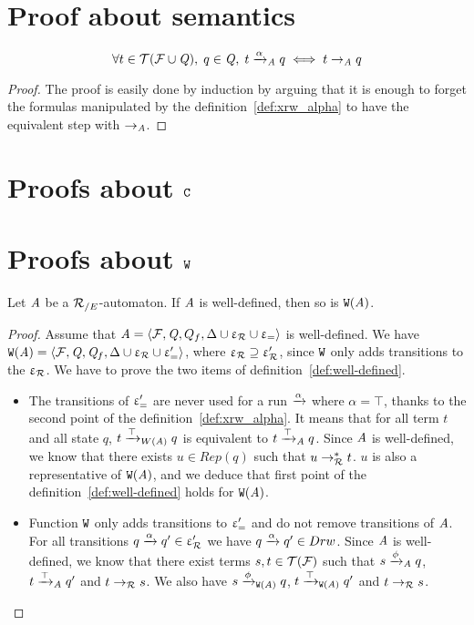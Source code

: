 \section{Proof about semantics}
\setcounter{savetheorem}{\thetheorem}
\setcounter{theorem}{4}

\begin{theorem}
  \[\forall t\in\mathcal{ T(F \cup \mathit Q)},\; q \in \mathit Q,\; t \xrightarrow{\alpha}_\mathit A q \; \Longleftrightarrow \; t \rightarrow_\mathit A q \]
\end{theorem}

\begin{proof}
  The proof is easily done by induction by arguing that it is enough to forget the formulas
  manipulated by the definition~\ref{def:xrw_alpha} to have the equivalent step with $\rightarrow_\mathit A$.
\end{proof}
\setcounter{theorem}{\thesavetheorem}

\section{Proofs about $\mathtt{C}$}


\section{Proofs about $\mathtt{W}$}

\begin{lemma}
  Let $\mathit A$ be a ${\mathcal R_{/E}}$-automaton. If $\mathit A$ is well-defined, then so is $\mathtt{W}(\mathit A)$.
\end{lemma}

\begin{proof}
  Assume that $\mathit A = \langle \mathcal{F}, \mathit Q, Q_f, \Delta \cup \upvarepsilon_{\mathcal R} \cup \upvarepsilon_{=}\rangle$ is well-defined.
  We have $\mathtt{W}(\mathit A) = \langle \mathcal{F}, \mathit Q, \mathit Q_f, \Delta \cup \upvarepsilon_{\mathcal R} \cup \upvarepsilon_{=}'\rangle$, where $\upvarepsilon_{\mathcal R} \supseteq \upvarepsilon_{\mathcal R}'$,
  since $\mathtt{W}$ only adds transitions to the $\upvarepsilon_{\mathcal R}$. We have to prove the two items of definition~\ref{def:well-defined}.
  \begin{itemize}
  \item 
    The transitions of $\upvarepsilon_{=}'$ are never used for a run $\xrightarrow{\alpha}$ where $\alpha = \top$,
    thanks to the second point of the definition~\ref{def:xrw_alpha}.
    It means that for all term $t$ and all state $q$, $t \xrightarrow{\top}_{W(\mathit A)} q$ is equivalent to $t \xrightarrow{\top}_\mathit A q$.
    Since $\mathit A$ is well-defined, we know that there exists $u \in Rep(q)$ such that $u \rightarrow^*_\mathcal R t$.
    $u$ is also a representative of $\mathtt{W}(\mathit A)$, and we deduce that first point of the definition~\ref{def:well-defined} 
    holds for $\mathtt{W}(\mathit A)$.
  \item
    Function $\mathtt{W}$ only adds transitions to $\upvarepsilon_{=}'$ and do not remove transitions of $\mathit A$.
    For all transitions $q \xrightarrow{\alpha} q' \in \upvarepsilon_{\mathcal R}'$ we have $q \xrightarrow{\alpha} q' \in Drw$.
    Since $\mathit A$ is well-defined, we know that there exist terms $s,t\in \mathcal{T(F)}$ such that
    $s\xrightarrow{\phi}_\mathit A q$, $t\xrightarrow{\top}_\mathit A q'$ and $t \rightarrow_\mathcal R s$.
    We also have $s\xrightarrow{\phi}_{\mathtt{W}(\mathit A)} q$, $t\xrightarrow{\top}_{\mathtt{W}(\mathit A)} q'$ and $t \rightarrow_\mathcal R s$.
  \end{itemize}
\end{proof}

